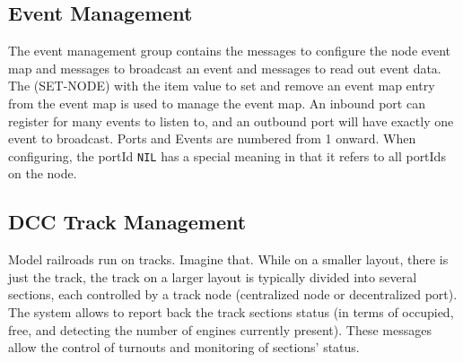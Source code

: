 \subsection{Event Management}

The event management group contains the messages to configure the node event map and messages to broadcast an event and messages to read out event data. The (SET-NODE) with the item value to set and remove an event map entry from the event map is used to manage the event map. An inbound port can register for many events to listen to, and an outbound port will have exactly one event to broadcast. Ports and Events are numbered from 1 onward. When configuring, the portId \texttt{NIL} has a special meaning in that it refers to all portIds on the node.

\begin{table}[ht!]
    \centering 
    \caption{Event Management}
\end{table}

\subsection{DCC Track Management}

Model railroads run on tracks. Imagine that. While on a smaller layout, there is just the track, the track on a larger layout is typically divided into several sections, each controlled by a track node \textnormal{(centralized node or decentralized port)}. The system allows to report back the track sections status \textnormal{(in terms of occupied, free, and detecting the number of engines currently present)}. These messages allow the control of turnouts and monitoring of sections' status.

\begin{table}[ht!]
    \centering 
    \caption{DCC Track Management}
\end{table}

